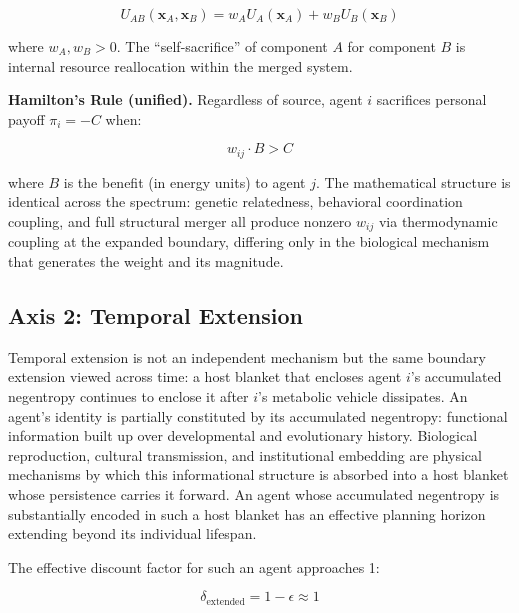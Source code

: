 \documentclass[11pt]{article}
\theoremstyle{plain}
\theoremstyle{definition}
\theoremstyle{remark}
\let\origsubsection\subsection
\renewcommand{\subsection}{\needspace{7\baselineskip}\origsubsection}
\begin{document}
\[U_{AB}(\mathbf{x}_A, \mathbf{x}_B) = w_A U_A(\mathbf{x}_A) + w_B U_B(\mathbf{x}_B)\]

where \(w_A, w_B > 0\). The ``self-sacrifice'' of component \(A\) for
component \(B\) is internal resource reallocation within the merged
system.

\textbf{Hamilton's Rule (unified).} Regardless of source, agent \(i\)
sacrifices personal payoff \(\pi_i = -C\) when:

\[w_{ij} \cdot B > C\]

where \(B\) is the benefit (in energy units) to agent \(j\). The
mathematical structure is identical across the spectrum: genetic
relatedness, behavioral coordination coupling, and full structural
merger all produce nonzero \(w_{ij}\) via thermodynamic coupling at the
expanded boundary, differing only in the biological mechanism that
generates the weight and its magnitude.

\subsection{Axis 2: Temporal Extension}\label{axis-2-temporal-extension}

Temporal extension is not an independent mechanism but the same boundary
extension viewed across time: a host blanket that encloses agent \(i\)'s
accumulated negentropy continues to enclose it after \(i\)'s metabolic
vehicle dissipates. An agent's identity is partially constituted by its
accumulated negentropy: functional information built up over
developmental and evolutionary history. Biological reproduction,
cultural transmission, and institutional embedding are physical
mechanisms by which this informational structure is absorbed into a host
blanket whose persistence carries it forward. An agent whose accumulated
negentropy is substantially encoded in such a host blanket has an
effective planning horizon extending beyond its individual lifespan.

The effective discount factor for such an agent approaches 1:

\[\delta_{\text{extended}} = 1 - \epsilon \approx 1\]
\end{document}
